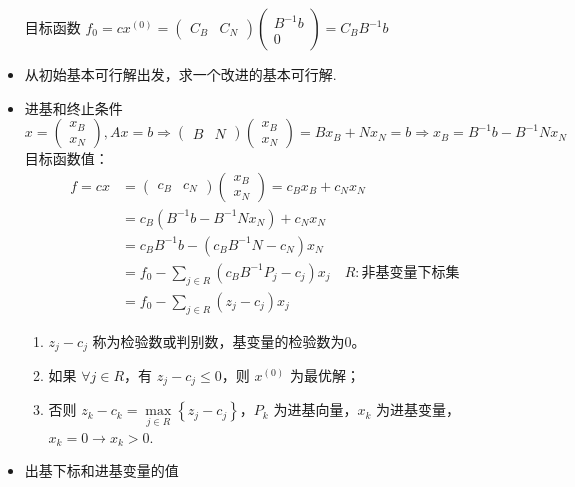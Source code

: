 \begin{note}
\begin{itemize}
            目标函数 $f_0 = cx^{(0)} = \begin{pmatrix}
                C_B & C_N
            \end{pmatrix} \begin{pmatrix}
                B^{-1}b \\
                0
            \end{pmatrix} = C_BB^{-1}b$
        \item 从初始基本可行解出发，求一个改进的基本可行解.
        \item 进基和终止条件
            \[
                x=\begin{pmatrix}
                    x_{B} \\
                    x_{N}
                \end{pmatrix}, Ax=b \Rightarrow\begin{pmatrix}
                    B & N
                \end{pmatrix}\begin{pmatrix}
                    x_{B} \\
                    x_{N}
                \end{pmatrix}=B x_{B}+N x_{N}=b \Rightarrow x_{B}=B^{-1}b-B^{-1} Nx_{N}
            \]
            目标函数值：
            \begin{align*}
                f = cx &= \begin{pmatrix}
                    c_B & c_N
                \end{pmatrix}\begin{pmatrix}
                    x_B \\
                    x_N
                \end{pmatrix} = c_Bx_B + c_Nx_N \\
                &= c_B(B^{-1}b - B^{-1}Nx_N) + c_Nx_N \\
                &= c_BB^{-1}b - (c_BB^{-1}N - c_N)x_N \\
                &= f_0 - \sum_{j\in R}(c_BB^{-1}P_j - c_j)x_j \quad R :\text{非基变量下标集} \\
                &=f_0 - \sum_{j\in R}(z_j - c_j)x_j
            \end{align*}
            \begin{enumerate}
                \item $z_j - c_j$ 称为检验数或判别数，基变量的检验数为0。
                \item 如果 $\forall j\in R$，有 $z_j - c_j \le 0$，则 $x^{(0)}$ 为最优解；
                \item 否则 $z_k - c_k = \underset{j \in R}{\max}\left\{z_j - c_j\right\}$，$P_k$ 为进基向量，$x_k$ 为进基变量，$x_k = 0 \to x_k > 0$.
            \end{enumerate}
        \item 出基下标和进基变量的值
        

\end{itemize}
\end{note}
